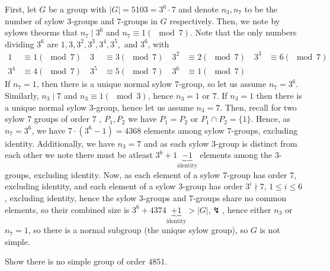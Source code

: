 \documentclass[a4paper]{article}
\begin{document}
\begin{solution}
	First, let \(G\) be a group with \( \left| G \right| = 5103 = 3^{6} \cdot 7\) and denote \(n_3, n_7\) to be the number of sylow \(3\)-groups and \(7\)-groups in \(G\) respectively. Then, we note by sylows theorms that \(n_7 \mid 3^{6}\) and \(n_7 \equiv 1 \left( \mod 7 \right) \). Note that the only numbers dividing \(3^{6}\) are \(1, 3, 3^2, 3^3, 3^{4}, 3^{5}, \) and \(3^{6}\), with
	\begin{align*}
		1 &\equiv 1 \left( \mod 7 \right) \quad
		3 &\equiv 3 \left( \mod 7 \right) \quad
		3^2 &\equiv 2 \left( \mod 7 \right) \quad
		3^3 &\equiv 6 \left( \mod 7 \right) \\
		3^{4} &\equiv 4 \left( \mod 7 \right) \quad
		3^{5} &\equiv 5 \left( \mod 7 \right) \quad
		3^{6} &\equiv 1 \left( \mod 7 \right) \quad
		\end{align*}
		If \(n_7 = 1\), then there is a unique normal sylow \(7\)-group, so let us assume \(n_7 = 3^{6}\). Similarly, \(n_3 \mid 7\) and \(n_3 \equiv 1 \left( \mod 3 \right) \), hence \(n_3 = 1\) or \(7\). If \(n_3 = 1\)  then there is a unique normal sylow \(3\)-group, hence let us assume \(n_3 = 7\). Then, recall for two sylow \(7\) groups of order \(7\) , \(P_1, P_2\) we have \(P_1 = P_2\) or \(P_1 \cap P_2 = \{1\} \). Hence, as \(n_7 = 3^{6}\), we have \(7 \cdot \left( 3^{6} - 1 \right)  = 4368\) elements among sylow \(7\)-groups, excluding identity. Additionally, we have \(n_3 = 7\) and as each sylow \(3\)-group is distinct from each other we note there must be atleast \(3^{6} + 1 \underbrace{ - 1}_{\text{identity}} \) elements among the \(3\)-groups, excluding identity. Now, as each element of a sylow \(7\)-group has order \(7\), excluding identity, and each element of a sylow \(3\)-group has order \(3^{i} \nmid 7\), \(1  \le i \le 6\), excluding identity, hence the sylow \(3\)-groups and \(7\)-groups share no common elements, so their combined size is \(3^{6} + 4374 \underbrace{ + 1}_{\text{identity}}  > \left| G \right| \),\(\lightning\), hence either \(n_3\) or \(n_7 = 1\), so there is a normal subgroup (the unique sylow group), so \(G\) is not simple.
\end{solution}
\newpage
\begin{problem}[5]
	Show there is no simple group of order \(4851\).
\end{problem}
\end{document}
